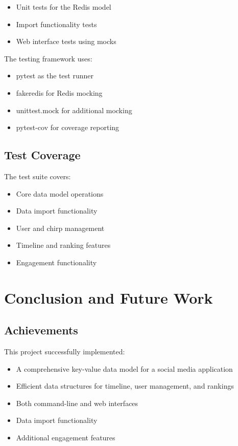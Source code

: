 \documentclass[a4paper,11pt]{article}
\begin{document}
\begin{itemize}
    \item Unit tests for the Redis model
    \item Import functionality tests
    \item Web interface tests using mocks
\end{itemize}

The testing framework uses:

\begin{itemize}
    \item pytest as the test runner
    \item fakeredis for Redis mocking
    \item unittest.mock for additional mocking
    \item pytest-cov for coverage reporting
\end{itemize}

\subsection{Test Coverage}
The test suite covers:

\begin{itemize}
    \item Core data model operations
    \item Data import functionality
    \item User and chirp management
    \item Timeline and ranking features
    \item Engagement functionality
\end{itemize}

\newpage
\section{Conclusion and Future Work}

\subsection{Achievements}
This project successfully implemented:

\begin{itemize}
    \item A comprehensive key-value data model for a social media application
    \item Efficient data structures for timeline, user management, and rankings
    \item Both command-line and web interfaces
    \item Data import functionality
    \item Additional engagement features
\end{itemize}
\end{document}
